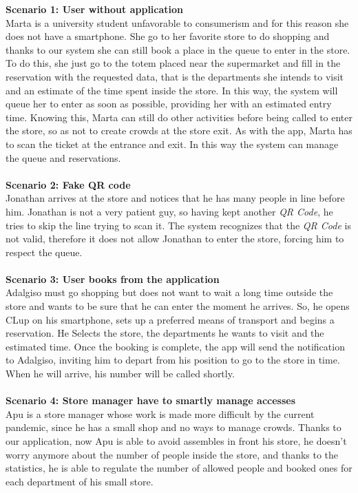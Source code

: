 \documentclass{article}
\begin{document}
			{\bfseries Scenario 1: User without application} \\
			Marta is a university student unfavorable to consumerism and for this reason she does not have a smartphone. She go to her favorite store to do shopping and thanks to our system she can still book a place in the queue to enter in the store. To do this, she just go to the totem placed near the supermarket and fill in the reservation with the requested data, that is the departments she intends to visit and an estimate of the time spent inside the store. In this way, the system will queue her to enter as soon as possible, providing her with an estimated entry time. Knowing this, Marta can still do other activities before being called to enter the store, so as not to create crowds at the store exit. As with the app, Marta has to scan the ticket at the  entrance and exit. In this way the system can manage the queue and reservations. \\ \\
			{\bfseries Scenario 2: Fake QR code} \\
			Jonathan arrives at the store and notices that he has many people in line before him. Jonathan is not a very patient guy, so having kept another \emph{QR Code}, he tries to skip the line trying to scan it. The system recognizes that the \emph{QR Code} is not valid, therefore it does not allow Jonathan to enter the store, forcing him to respect the queue. \\ \\
			{\bfseries Scenario 3: User books from the application} \\
			Adalgiso must go shopping but does not want to wait a long time outside the store and wants to be sure that he can enter the moment he arrives. So, he opens CLup on his smartphone, sets up a preferred means of transport and begins a reservation. He Selects the store, the departments he wants to visit and the estimated time. Once the booking is complete, the app will send the notification to Adalgiso, inviting him to depart from his position to go to the store in time. When he will arrive, his number will be called shortly.\\ \\
			{\bfseries Scenario 4: Store manager have to smartly manage accesses} \\
			Apu is a store manager whose work is made more difficult by the current pandemic, since he has a small shop and no ways to manage crowds. Thanks to our application, now Apu is able to avoid assembles in front his store, he doesn't worry anymore about the number of people inside the store, and thanks to the statistics, he is able to regulate the number of allowed people and booked ones for each department of his small store.
		\newpage
\end{document}
